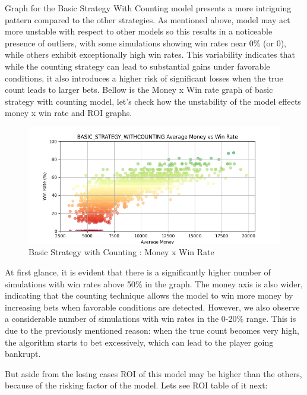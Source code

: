 \documentclass[a4paper,12pt]{report}
\begin{document}
Graph for the Basic Strategy With Counting model presents a more intriguing pattern compared to the other strategies. As mentioned above, model may act more unstable with respect to other models so this results in a noticeable presence of outliers, with some simulations showing win rates near 0\% (or 0), while others exhibit exceptionally high win rates. This variability indicates that while the counting strategy can lead to substantial gains under favorable conditions, it also introduces a higher risk of significant losses when the true count leads to larger bets. Bellow is the Money x Win rate graph of basic strategy with counting model, let's check how the unstability of the model effects money x win rate and ROI graphs.

\begin{figure}[h]
\begin{center}
\includegraphics[scale=0.6]{figures/graphs/bsc_money_wr_big.png}
\end{center}
\caption{Basic Strategy with Counting : Money x Win Rate}
\label{fig:bsc_wr}
\end{figure}

At first glance, it is evident that there is a significantly higher number of simulations with win rates above 50\% in the graph. The money axis is also wider, indicating that the counting technique allows the model to win more money by increasing bets when favorable conditions are detected. However, we also observe a considerable number of simulations with win rates in the 0-20\% range. This is due to the previously mentioned reason: when the true count becomes very high, the algorithm starts to bet excessively, which can lead to the player going bankrupt.

But aside from the losing cases ROI of this model may be higher than the others, because of the risking factor of the model. Lets see ROI table of it next:
\end{document}
